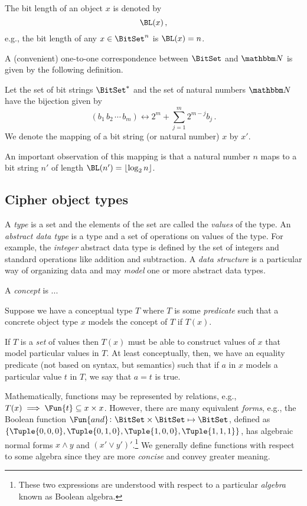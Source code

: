 \documentclass[ ../main.tex]{subfiles}
\begin{document}
The bit length of an object $x$ is denoted by
\begin{equation}
\BL(x)\,,
\end{equation}
e.g., the bit length of any $x \in \BitSet^n$ is $\BL(x) = n$.

A (convenient) one-to-one correspondence between $\BitSet$ and $\NatSet$ is given by the following definition.
\begin{definition}
	\label{def:mapping}
	Let the set of bit strings $\BitSet^{*}$ and the set of natural numbers 
	$\NatSet$ have the bijection given by
	\begin{equation}
	(b_1 \, b_2 \, \cdots \, b_m) \longleftrightarrow 2^m + \sum_{j=1}^{m} 2^{m - j} b_j\,.
	\end{equation}
	We denote the mapping of a bit string (or natural number) $x$ by $x'$.
\end{definition}
An important observation of this mapping is that a natural number $n$ maps to a bit string $n'$ of length $\BL(n') = \lfloor \log_2 n \rfloor$.

\subsection{Cipher object types}
A \emph{type} is a set and the elements of the set are called the \emph{values} of the type.
An \emph{abstract data type} is a type and a set of operations on values of the type.
For example, the \emph{integer} abstract data type is defined by the set of integers and standard operations like addition and subtraction.
A \emph{data structure} is a particular way of organizing data and may \emph{model} one or more abstract data types.

A \emph{concept} is ...

Suppose we have a conceptual type $T$ where $T$ is some \emph{predicate} such that a concrete object type $x$ models the concept of $T$ if $T(x)$.

If $T$ is a \emph{set} of values then $T(x)$ must be able to construct values of $x$ that model particular values in $T$.
At least conceptually, then, we have an equality predicate (not based on syntax, but semantics) such that if $a$ in $x$ models a particular value $t$ in $T$, we say that $a = t$ is true.

Mathematically, functions may be represented by relations, e.g., $T(x) \implies \Fun{t} \subseteq x \times x$.
However, there are many equivalent \emph{forms}, e.g., the Boolean function $\Fun{and} \colon \BitSet \times \BitSet \mapsto \BitSet$, defined as $\{\Tuple{0,0,0},\Tuple{0,1,0},\Tuple{1,0,0},\Tuple{1,1,1}\}$, has algebraic normal forms $x \land y$ and $(x' \lor y')'$.\footnote{These two expressions are understood with respect to a particular \emph{algebra} known as Boolean algebra.}
We generally define functions with respect to some algebra since they are more \emph{concise} and convey greater meaning.
\end{document}
